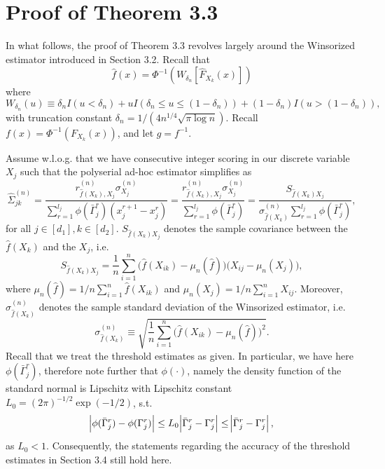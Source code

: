 \section{Proof of Theorem 3.3
 }\label{proof_concentration2}

In what follows, the proof of Theorem 3.3
revolves largely around the Winsorized estimator introduced in Section 3.2. %
Recall that \[\hat{f}(x) = \Phi^{-1}(W_{\delta_n}[\hat{F}_{X_k}(x)])\] where \[W_{\delta_n}(u) \equiv \delta_n I(u < \delta_n) + u I(\delta_n \leq u \leq (1-\delta_n)) + (1-\delta_n) I(u > (1-\delta_n)),\] with truncation constant $\delta_n = 1/(4n^{1/4}\sqrt{\pi\log n})$. Recall $f(x) = \Phi^{-1}(F_{X_k}(x))$, and let $g = f^{-1}$.

Assume w.l.o.g. that we have consecutive integer scoring in our discrete variable $X_j$ such that the polyserial ad-hoc estimator simplifies as
\begin{equation}
    \hat{\Sigma}_{jk}^{(n)} = \frac{r^{(n)}_{\hat{f}(X_k),X_j} \sigma^{(n)}_{X_j}}{\sum_{r=1}^{l_{j}} \phi(\bar{\Gamma}_j^r)(x_j^{r+1} - x_j^r)} = \frac{r^{(n)}_{\hat{f}(X_k),X_j} \sigma^{(n)}_{X_j}}{\sum_{r=1}^{l_{j}} \phi(\bar{\Gamma}_j^r)} = \frac{S_{\hat{f}(X_k)X_j}}{\sigma^{(n)}_{\hat{f}(X_k)}\sum_{r=1}^{l_{j}} \phi(\bar{\Gamma}_j^r)},
\end{equation}
for all $j \in [d_1], k \in [d_2]$. $S_{\hat{f}(X_k)X_j}$ denotes the sample covariance between the $\hat{f}(X_k)$ and the $X_j$, i.e.
\begin{equation*}
    S_{\hat{f}(X_k)X_j} = \frac{1}{n}\sum_{i=1}^n \Big(\hat{f}(X_{ik}) - \mu_n(\hat{f})\Big)\Big(X_{ij} - \mu_n(X_j)\Big),
\end{equation*}
where $\mu_n(\hat{f}) = 1/n\sum_{i=1}^n\hat f(X_{ik})$ and $\mu_n(X_j) = 1/n\sum_{i=1}^n X_{ij}$. Moreover, $\sigma^{(n)}_{\hat{f}(X_k)}$ denotes the sample standard deviation of the Winsorized estimator, i.e.
\begin{equation*}
    \sigma^{(n)}_{\hat{f}(X_k)} \equiv \sqrt{\frac{1}{n}\sum_{i=1}^n \Big(\hat{f}(X_{ik}) - \mu_n(\hat{f})\Big)^2}.
\end{equation*}
Recall that we treat the threshold estimates as given. In particular, we have here $\phi(\bar{\Gamma}_j^r)$, therefore note further that $\phi(\cdot)$, namely the density function of the standard normal is Lipschitz with Lipschitz constant $L_0 = (2\pi)^{-1/2}\exp(-1/2)$, s.t.
\begin{equation*}
    \abs{\phi(\bar{\Gamma}^r_j) - \phi(\Gamma^r_j)} \leq L_0 \abs{\bar{\Gamma}^r_j - \Gamma^r_j} \leq \abs{\bar{\Gamma}^r_j - \Gamma^r_j},
\end{equation*}
as $L_0 < 1$. Consequently, the statements regarding the accuracy of the threshold estimates in Section 3.4 %
still hold here.

